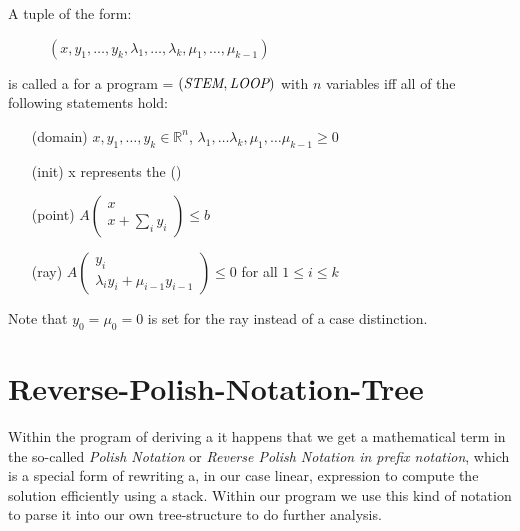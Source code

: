 \begin{definition}
	\label{def:gna}
	A tuple of the form:
	\begin{figure}[H]
		\centering
		$(x, y_1, \dots, y_k, \lambda_1, \dots, \lambda_k, \mu_1, \dots, \mu_{k-1})$
	\end{figure}  
	\vspace{-1em}
	is called a \gna for a program = $(\textit{STEM}, \textit{LOOP})$ with $n$ variables iff all of the following statements hold:
	\begin{itemize}
		\setlength{\itemindent}{1in}
		\item[(domain)] $x, y_1, \dots, y_k \in \mathbb{R}^n$, $\lambda_1, \dots \lambda_k, \mu_1, \dots \mu_{k-1} \ge 0$
		\item[(init)] x represents the \startterm (\stem)
		\item[(point)] $A\begin{pmatrix} x \\ x + \sum_i y_i \end{pmatrix} \le b$
		\item[(ray)] $A\begin{pmatrix} y_i \\ \lambda_i y_i + \mu_{i-1} y_{i-1} \end{pmatrix} \le 0$ for all $1 \le i \le k$
	\end{itemize}
	Note that $y_0 = \mu_0 = 0$ is set for the ray instead of a case distinction. 
\end{definition}


\section{Reverse-Polish-Notation-Tree}
\label{sec:rpntree}
Within the program of deriving a \gna it happens that we get a mathematical term in the so-called \textit{Polish Notation} or \textit{Reverse Polish Notation in prefix notation}, which is a special form of rewriting a, in our case linear, expression to compute the solution efficiently using a stack. Within our program we use this kind of notation to parse it into our own tree-structure to do further analysis. \cite{wikirpn}

